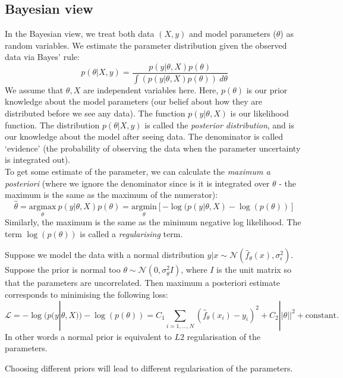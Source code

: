 \subsection{Bayesian view}
In the Bayesian view, we treat both data $(X,y)$ and model parameters ($\theta$) as random variables. We estimate the parameter distribution given the observed data via Bayes' rule:
\begin{equation*}
p(\theta | X,y) = \frac{p(y | \theta,X) p(\theta)}{\displaystyle \int \left( p(y | \theta,X) p(\theta) \right) \ d\theta}
\end{equation*}
We assume that $\theta, X$ are independent variables here. Here, $p(\theta)$ is our prior knowledge about the model parameters (our belief about how they are distributed before we see any data). The function $p(y | \theta, X)$ is our likelihood function. The distribution $p(\theta | X,y)$ is called the \textit{posterior distribution}, and is our knowledge about the model after seeing data. The denominator is called `evidence' (the probability of observing the data when the parameter uncertainty is integrated out). \\

To get some estimate of the parameter, we can calculate the \textit{maximum a posteriori} (where we ignore the denominator since is it is integrated over $\theta$ - the maximum is the same as the maximum of the numerator):
\begin{equation*}
\hat{\theta} = \underset{\theta}{\textrm{argmax}}\ p(y | \theta, X) p(\theta) = \underset{\theta}{\textrm{argmin}}\left[ - \log(p(y | \theta, X) - \log(p(\theta)) \right]
\end{equation*}
Similarly, the maximum is the same as the minimum negative log likelihood. The term $\log(p(\theta))$ is called a \textit{regularising} term.

\begin{frameex}
Suppose we model the data with a normal distribution $y|x \sim \mathcal{N}(\hat{f}_{\theta}(x), \sigma_{\epsilon}^2)$. Suppose the prior is normal too $\theta \sim \mathcal{N}(0, \sigma_{\theta}^2 I)$, where $I$ is the unit matrix so that the parameters are uncorrelated. Then maximum a posteriori estimate corresponds to minimising the following loss:
\begin{equation*}
\mathcal{L} = -\log(p(y|\theta,X)) - \log(p(\theta)) = C_1 \sum_{i=1,...,N} (\hat{f}_{\theta}(x_i) - y_i)^2 + C_2 || \theta||^2 + \text{constant}.
\end{equation*}
In other words a normal prior is equivalent to $L2$ regularisation of the parameters.
\end{frameex} 

Choosing different priors will lead to different regularisation of the parameters.






